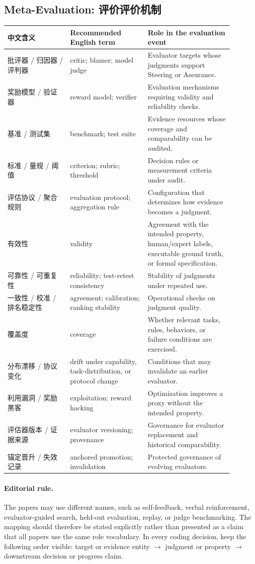 \subsection*{Meta-Evaluation: 评价评价机制}
\begin{tabular}{p{0.25\linewidth} p{0.31\linewidth} p{0.34\linewidth}}
\textbf{中文含义} & \textbf{Recommended English term} & \textbf{Role in the evaluation event} \\
\hline
批评器 / 归因器 / 评判器 & critic; blamer; model judge & Evaluator targets whose judgments support Steering or Assurance. \\
奖励模型 / 验证器 & reward model; verifier & Evaluation mechanisms requiring validity and reliability checks. \\
基准 / 测试集 & benchmark; test suite & Evidence resources whose coverage and comparability can be audited. \\
标准 / 量规 / 阈值 & criterion; rubric; threshold & Decision rules or measurement criteria under audit. \\
评估协议 / 聚合规则 & evaluation protocol; aggregation rule & Configuration that determines how evidence becomes a judgment. \\
有效性 & validity & Agreement with the intended property, human/expert labels, executable ground truth, or formal specification. \\
可靠性 / 可重复性 & reliability; test-retest consistency & Stability of judgments under repeated use. \\
一致性 / 校准 / 排名稳定性 & agreement; calibration; ranking stability & Operational checks on judgment quality. \\
覆盖度 & coverage & Whether relevant tasks, rules, behaviors, or failure conditions are exercised. \\
分布漂移 / 协议变化 & drift under capability, task-distribution, or protocol change & Conditions that may invalidate an earlier evaluator. \\
利用漏洞 / 奖励黑客 & exploitation; reward hacking & Optimization improves a proxy without the intended property. \\
评估器版本 / 证据来源 & evaluator versioning; provenance & Governance for evaluator replacement and historical comparability. \\
锚定晋升 / 失效记录 & anchored promotion; invalidation & Protected governance of evolving evaluators. \\
\end{tabular}

\paragraph{Editorial rule.}
The papers may use different names, such as self-feedback, verbal reinforcement, evaluator-guided search, held-out evaluation, replay, or judge benchmarking. The mapping should therefore be stated explicitly rather than presented as a claim that all papers use the same role vocabulary. In every coding decision, keep the following order visible: target or evidence entity $\rightarrow$ judgment or property $\rightarrow$ downstream decision or progress claim.
